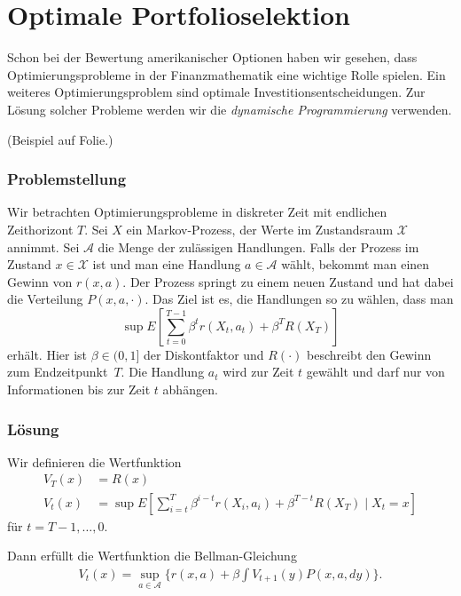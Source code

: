 \documentclass[a4paper,twoside,DIV15,BCOR12mm]{scrbook}
\newcommand{\cX}{\mathcal X}
\newcommand{\cA}{\mathcal A}
\begin{document}
\chapter{Optimale Portfolioselektion}
\addtocounter{section}{1}
\setcounter{satz}{0}

Schon bei der Bewertung amerikanischer Optionen haben wir gesehen, dass Optimierungsprobleme in der Finanzmathematik eine wichtige Rolle spielen. Ein weiteres Optimierungsproblem sind optimale Investitionsentscheidungen. Zur Lösung solcher Probleme werden wir die \emph{dynamische Programmierung} verwenden.

\begin{beispiel}[Apfelbäume]
(Beispiel auf Folie.)
\end{beispiel}

\subsection{Problemstellung}
Wir betrachten Optimierungsprobleme in diskreter Zeit mit endlichen Zeithorizont $T$. Sei $X$ ein Markov-Prozess, der Werte im Zustandsraum $\cX$ annimmt. Sei $\cA$ die Menge der zulässigen Handlungen. Falls der Prozess im Zustand $x\in\cX$ ist und man eine Handlung $a\in \cA$ wählt, bekommt man einen Gewinn von $r(x,a)$. Der Prozess springt zu einem neuen Zustand und hat dabei die Verteilung $P(x,a,\cdot)$. Das Ziel ist es, die Handlungen so zu wählen, dass man 
\[
\sup E\left[\sum_{t=0}^{T-1} \beta^t r(X_t,a_t) + \beta^T R(X_T)\right]
\]
erhält. Hier ist $\beta\in(0,1]$ der Diskontfaktor und $R(\cdot)$ beschreibt den Gewinn zum Endzeitpunkt~$T$. Die Handlung $a_t$ wird zur Zeit $t$ gewählt und darf nur von Informationen bis zur Zeit $t$ abhängen.

\subsection{Lösung}
Wir definieren die Wertfunktion
\begin{align*}
V_T(x) &= R(x) \\
V_t(x) &= \sup E [\sum_{i=t}^T \beta^{i-t} r(X_i,a_i) + \beta^{T-t} R(X_T)\mid X_t = x]
\end{align*}
für $t=T-1,\ldots, 0$.

Dann erfüllt die Wertfunktion die Bellman-Gleichung 
\begin{align*}
V_t(x) = \sup_{a\in \cA} \{ r(x,a) + \beta \int V_{t+1} (y) P(x,a,dy)\}.
\end{align*}
\end{document}
